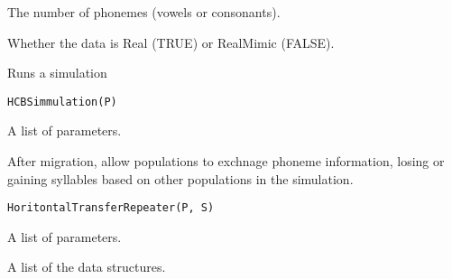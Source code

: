 \documentclass[a4paper]{book}
\begin{document}
%
\begin{Arguments}
\begin{ldescription}
\item[\code{nPhoneme}] The number of phonemes (vowels or consonants).

\item[\code{actual}] Whether the data is Real (TRUE) or RealMimic (FALSE).
\end{ldescription}
\end{Arguments}
%
\begin{Description}\relax
Runs a simulation
\end{Description}
%
\begin{Usage}
\begin{verbatim}
HCBSimmulation(P)
\end{verbatim}
\end{Usage}
%
\begin{Arguments}
\begin{ldescription}
\item[\code{P}] A list of parameters.
\end{ldescription}
\end{Arguments}
%
\begin{Description}\relax
After migration, allow populations to exchnage phoneme information, losing or gaining syllables based on other populations in the simulation.
\end{Description}
%
\begin{Usage}
\begin{verbatim}
HoritontalTransferRepeater(P, S)
\end{verbatim}
\end{Usage}
%
\begin{Arguments}
\begin{ldescription}
\item[\code{P}] A list of parameters.

\item[\code{S}] A list of the data structures.
\end{ldescription}
\end{Arguments}
\end{document}
